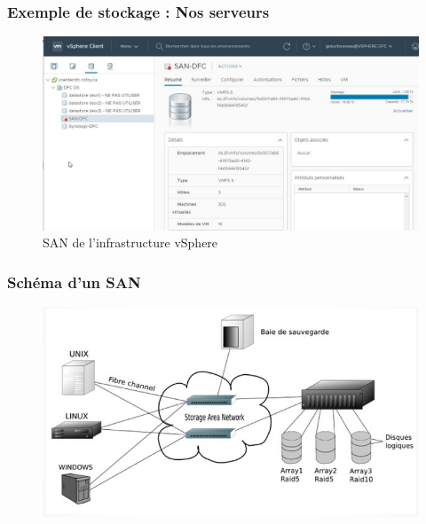 	
	\begin{frame}[containsverbatim]
		\frametitle{Exemple de stockage : Nos serveurs}
		\begin{figure}[!h]
			\centering
			\includegraphics[scale=0.4]{images/SAN}
			\caption{SAN de l'infrastructure vSphere}
			\label{rand}
		\end{figure}
		
	\end{frame}
	
	
	
	\begin{frame}[containsverbatim]
		\frametitle{Schéma d'un SAN}
		\begin{figure}
			\centering
			\includegraphics[scale=0.6]{images/image1}
		\end{figure}
		
		
	\end{frame}
	
